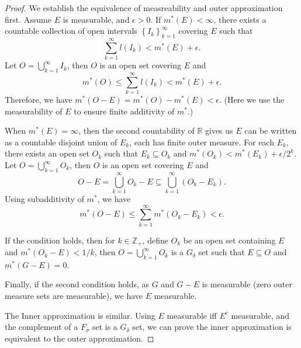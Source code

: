 \documentclass[../main.tex]{subfiles}
\begin{document}
\begin{proof}
	We establish the equivalence of measreability and outer approximation first. Assume $E$ is measurable, and $\epsilon>0$. If $m^*(E)<\infty $, there exists a countable collection of open intervals $\left\{ I_k \right\}_{k=1}^{\infty }$ covering $E$ such that
	\begin{equation*}
		\sum_{k=1}^{\infty } l(I_k) < m^*(E) + \epsilon.
	\end{equation*}
	Let $O = \bigcup_{k=1}^{\infty } I_k$, then $O$ is an open set covering $E$ and
	\begin{equation*}
		m^*(O) \leq \sum_{k=1}^{\infty } l(I_k) < m^*(E) + \epsilon.
	\end{equation*}
	Therefore, we have $m^*(O-E) = m^*(O) - m^*(E) < \epsilon$. (Here we use the measurability of $E$ to ensure finite additivity of $m^*$.)

	When $m^*(E) = \infty $, then the second countability of $\mathbb{R}$ gives us $E$ can be written as a countable disjoint union of $E_k$, each has finite outer measure. For each $E_k$, there exists an open set $O_k$ such that $E_k \subseteq O_k$ and $m^*(O_k) < m^*(E_k) + \epsilon / 2^k$. Let $O = \bigcup_{k=1}^{\infty } O_k$, then $O$ is an open set covering $E$ and
	\begin{equation*}
		O-E = \bigcup_{k=1}^{\infty } O_k - E \subseteq \bigcup_{k=1}^{\infty } (O_k - E_k).
	\end{equation*}
	Using subadditivity of $m^*$, we have
	\begin{equation*}
		m^*(O-E) \leq \sum_{k=1}^{\infty } m^*(O_k - E_k) < \epsilon.
	\end{equation*}

	If the condition holds, then for $k\in \mathbb{Z}_+$, define $O_k$ be an open set containing $E$ and $m^*(O_k-E) < 1 / k$, then $O = \bigcup_{k=1}^{\infty } O_k$ is a $G_{\delta}$ set such that $E \subseteq O$ and $m^*(G-E) = 0$.

	Finally, if the second condition holds, as $G$ and $G-E$ is measurable (zero outer measure sets are measurable), we have $E$ measurable.

	The Inner approximation is similar. Using $E$ measurable iff $E^c$ measurable, and the complement of a $F_{\sigma}$ set is a $G_{\delta}$ set, we can prove the inner approximation is equivalent to the outer approximation.

\end{proof}
\end{document}
